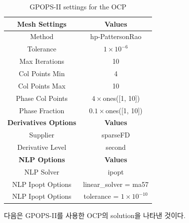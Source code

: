 \begin{table}[H]
    \begin{tabular}{|c|c|}
        \hline
        \textbf{Mesh Settings} & \textbf{Values} \\
        \hline
        Method                 & hp-PattersonRao  \\
        Tolerance              & $1 \times 10^{-6}$ \\
        Max Iterations         & 10               \\
        Col Points Min         & 4                \\
        Col Points Max         & 10               \\
        Phase Col Points       & $4 \times$ones([1, 10]) \\
        Phase Fraction         & $0.1 \times$ones([1, 10]) \\
        \hline
        \textbf{Derivatives Options} & \textbf{Values} \\
        \hline
        Supplier              & sparseFD        \\
        Derivative Level      & second          \\
        \hline
        \textbf{NLP Options} & \textbf{Values} \\
        \hline
        NLP Solver            & ipopt           \\
        NLP Ipopt Options    & linear\_solver = ma57 \\
        NLP Ipopt Options    & tolerance = $1 \times 10^{-10}$ \\
        \hline
    \end{tabular}
    \centering
    \caption{GPOPS-II settings for the OCP}
    \label{tab4}
\end{table}

다음은 GPOPS-II를 사용한 OCP의 solution을 나타낸 것이다.

